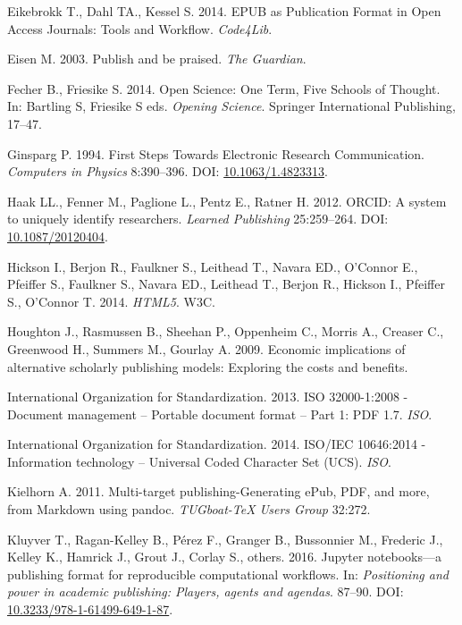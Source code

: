\documentclass[10pt,fleqn]{wlpeerj}
\begin{document}
\hypertarget{ref-eikebrokkux5fepubux5f2014}{}
Eikebrokk T., Dahl TA., Kessel S. 2014. EPUB as Publication Format in
Open Access Journals: Tools and Workflow. \emph{Code4Lib}.

\hypertarget{ref-eisenux5fpublishux5f2003}{}
Eisen M. 2003. Publish and be praised. \emph{The Guardian}.

\hypertarget{ref-fecherux5fopenux5f2014}{}
Fecher B., Friesike S. 2014. Open Science: One Term, Five Schools of
Thought. In: Bartling S, Friesike S eds. \emph{Opening Science}.
Springer International Publishing, 17--47.

\hypertarget{ref-ginspargux5ffirstux5f1994}{}
Ginsparg P. 1994. First Steps Towards Electronic Research Communication.
\emph{Computers in Physics} 8:390--396. DOI:
\href{https://doi.org/10.1063/1.4823313}{10.1063/1.4823313}.

\hypertarget{ref-haakux5forcidux5f2012}{}
Haak LL., Fenner M., Paglione L., Pentz E., Ratner H. 2012. ORCID: A
system to uniquely identify researchers. \emph{Learned Publishing}
25:259--264. DOI:
\href{https://doi.org/10.1087/20120404}{10.1087/20120404}.

\hypertarget{ref-HTML5}{}
Hickson I., Berjon R., Faulkner S., Leithead T., Navara ED., O'Connor
E., Pfeiffer S., Faulkner S., Navara ED., Leithead T., Berjon R.,
Hickson I., Pfeiffer S., O'Connor T. 2014. \emph{HTML5}. W3C.

\hypertarget{ref-houghtonux5feconomicux5f2009}{}
Houghton J., Rasmussen B., Sheehan P., Oppenheim C., Morris A., Creaser
C., Greenwood H., Summers M., Gourlay A. 2009. Economic implications of
alternative scholarly publishing models: Exploring the costs and
benefits.

\hypertarget{ref-internationalux5forganizationux5fforux5fstandardizationux5fisoux5f2013}{}
International Organization for Standardization. 2013. ISO 32000-1:2008 -
Document management -- Portable document format -- Part 1: PDF 1.7.
\emph{ISO}.

\hypertarget{ref-internationalux5forganizationux5fforux5fstandardizationux5fisoux2fiecux5f2014}{}
International Organization for Standardization. 2014. ISO/IEC 10646:2014
- Information technology -- Universal Coded Character Set (UCS).
\emph{ISO}.

\hypertarget{ref-kielhornux5fmultiux5f2011}{}
Kielhorn A. 2011. Multi-target publishing-Generating ePub, PDF, and
more, from Markdown using pandoc. \emph{TUGboat-TeX Users Group} 32:272.

\hypertarget{ref-kluyverux5fjupyterux5f2016}{}
Kluyver T., Ragan-Kelley B., Pérez F., Granger B., Bussonnier M.,
Frederic J., Kelley K., Hamrick J., Grout J., Corlay S., others. 2016.
Jupyter notebooks---a publishing format for reproducible computational
workflows. In: \emph{Positioning and power in academic publishing:
Players, agents and agendas}. 87--90. DOI:
\href{https://doi.org/10.3233/978-1-61499-649-1-87}{10.3233/978-1-61499-649-1-87}.
\end{document}
